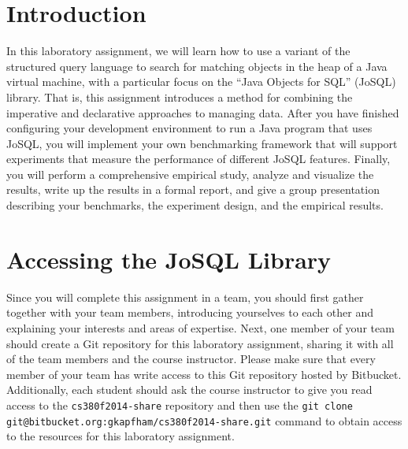 


\usepackage[compact]{titlesec}



\section*{Introduction}

In this laboratory assignment, we will learn how to use a variant of the structured query language to search for
matching objects in the heap of a Java virtual machine, with a particular focus on the ``Java Objects for SQL'' (JoSQL)
library. That is, this assignment introduces a method for combining the imperative and declarative approaches to
managing data. After you have finished configuring your development environment to run a Java program that uses JoSQL,
you will implement your own benchmarking framework that will support experiments that measure the performance of
different JoSQL features.  Finally, you will perform a comprehensive empirical study, analyze and visualize the results,
write up the results in a formal report, and give a group presentation describing your benchmarks, the experiment
design, and the empirical results.

\section*{Accessing the JoSQL Library}

Since you will complete this assignment in a team, you should first gather together with your team members, introducing
yourselves to each other and explaining your interests and areas of expertise. Next, one member of your team should
create a Git repository for this laboratory assignment, sharing it with all of the team members and the course
instructor. Please make sure that every member of your team has write access to this Git repository hosted by Bitbucket.
Additionally, each student should ask the course instructor to give you read access to the {\tt cs380f2014-share}
repository and then use the {\tt git clone git@bitbucket.org:gkapfham/cs380f2014-share.git} command to obtain access to
the resources for this laboratory assignment.

